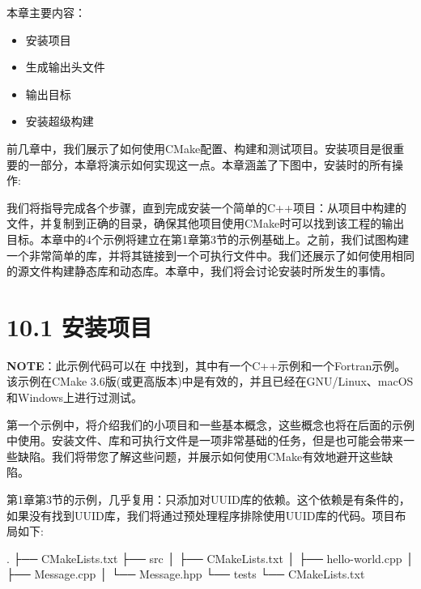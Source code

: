 本章主要内容：

\begin{itemize}
\item 安装项目

\item 生成输出头文件

\item 输出目标

\item 安装超级构建

\end{itemize}

前几章中，我们展示了如何使用CMake配置、构建和测试项目。安装项目是很重要的一部分，本章将演示如何实现这一点。本章涵盖了下图中，安装时的所有操作:


我们将指导完成各个步骤，直到完成安装一个简单的C++项目：从项目中构建的文件，并复制到正确的目录，确保其他项目使用CMake时可以找到该工程的输出目标。本章中的4个示例将建立在第1章第3节的示例基础上。之前，我们试图构建一个非常简单的库，并将其链接到一个可执行文件中。我们还展示了如何使用相同的源文件构建静态库和动态库。本章中，我们将会讨论安装时所发生的事情。


\section{10.1 安装项目}

\begin{myInfoBox}
\textbf{NOTE}：此示例代码可以在  中找到，其中有一个C++示例和一个Fortran示例。该示例在CMake 3.6版(或更高版本)中是有效的，并且已经在GNU/Linux、macOS和Windows上进行过测试。
\end{myInfoBox}

第一个示例中，将介绍我们的小项目和一些基本概念，这些概念也将在后面的示例中使用。安装文件、库和可执行文件是一项非常基础的任务，但是也可能会带来一些缺陷。我们将带您了解这些问题，并展示如何使用CMake有效地避开这些缺陷。


第1章第3节的示例，几乎复用：只添加对UUID库的依赖。这个依赖是有条件的，如果没有找到UUID库，我们将通过预处理程序排除使用UUID库的代码。项目布局如下:

\begin{codebox}[shell]
.
├── CMakeLists.txt
├── src
│    ├── CMakeLists.txt
│    ├── hello-world.cpp
│    ├── Message.cpp
│    └── Message.hpp
└── tests
    └── CMakeLists.txt
\end{codebox}

